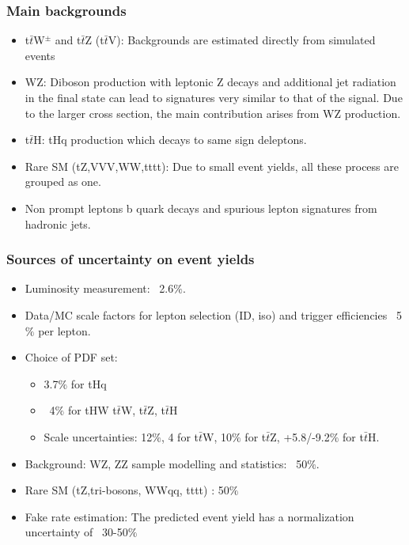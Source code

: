 \documentclass[11pt]{beamer}
\begin{document}
\begin{frame}
\frametitle{Main backgrounds}
\begin{itemize}
\item t$\bar{t}$W$^\pm$ and t$\bar{t}$Z (t$\bar{t}$V): Backgrounds are estimated directly from simulated events%
\item WZ: Diboson production with leptonic Z decays and additional jet radiation in the final state can
lead to signatures very similar to that of the signal. Due to the larger cross section, the main
contribution arises from WZ production.
\item t$\bar{t}$H: tHq production which decays to same sign deleptons.
\item Rare SM (tZ,VVV,WW,tttt): Due to small event yields, all these process are grouped as one.
\item Non prompt leptons b quark decays and spurious lepton signatures from hadronic jets.
\end{itemize}
\end{frame}

\begin{frame}
\frametitle{Sources of uncertainty on event yields}
\begin{itemize}
	\item Luminosity measurement: ~2.6$\%$.
	\item Data/MC scale factors for lepton selection (ID, iso) and trigger efficiencies ~5$\%$ per lepton.
	\item Choice of PDF set:
	\begin{itemize}
		\item 3.7$\%$ for tHq
		\item ~4$\%$ for tHW t$\bar{t}$W, t$\bar{t}$Z, t$\bar{t}$H 
		\item Scale uncertainties: 12$\%$, 4 for t$\bar{t}$W, 10$\%$ for t$\bar{t}$Z, +5.8/-9.2$\%$ for t$\bar{t}$H.
	\end{itemize}
	\item Background: WZ, ZZ sample modelling and statistics: ~50$\%$.
	\item Rare SM (tZ,tri-bosons, WWqq, tttt) : 50$\%$
	\item Fake rate estimation:
	The predicted event yield has a normalization uncertainty of ~30-50$\%$ \cite{7}
\end{itemize}

\end{frame}
\end{document}
